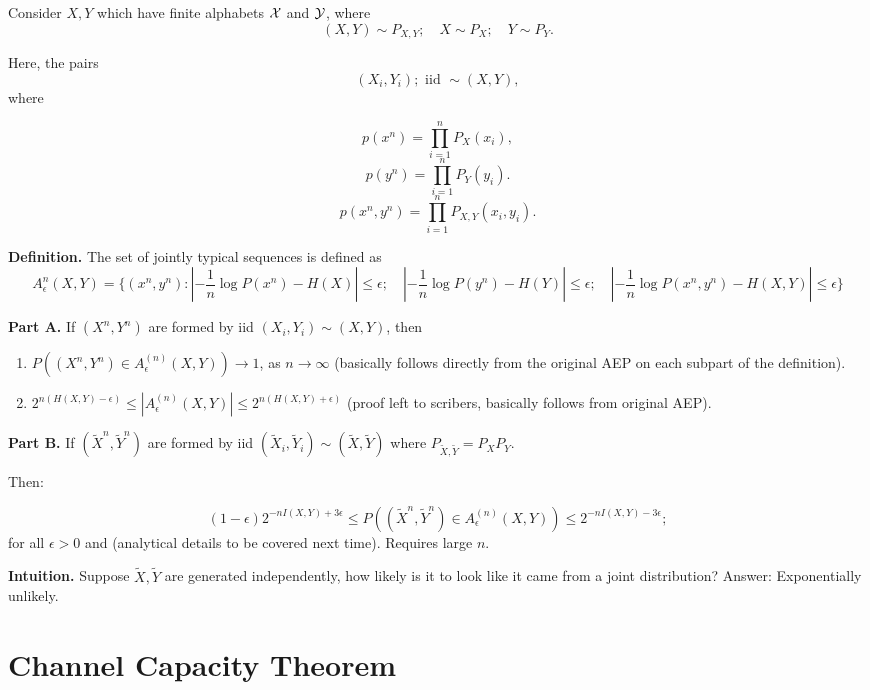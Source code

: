 Consider $X, Y$ which have finite alphabets $\mathcal{X}$ and $\mathcal{Y}$, where
\[
  (X, Y) \sim P_{X, Y}; \quad X \sim P_X; \quad Y \sim P_Y.
\]

Here, the pairs
\[
  (X_i, Y_i); \text{ iid } \sim (X, Y),
\]
where 

\[
  p(x^n) = \prod_{i=1}^{n} P_X(x_i),
\]
\[
  p(y^n) = \prod_{i=1}^{n} P_Y (y_i).
\]
\[
  p(x^n, y^n) = \prod_{i=1}^{n} P_{X, Y} (x_i, y_i).
\]

{\bf Definition.} The set of jointly typical sequences is defined as
\[
  A^{n}_{\epsilon} (X, Y) = \{ (x^n, y^n): \left |-\frac{1}{n} \log P(x^n) - H(X) \right | \leq \epsilon; \quad \left | - \frac{1}{n} \log P(y^n) - H(Y) \right | \leq \epsilon; \quad \left |- \frac{1}{n} \log P(x^n, y^n) - H(X, Y) \right | \leq \epsilon\}
\]

{\bf Part A.} If $(X^n, Y^n)$ are formed by iid $(X_i, Y_i) \sim (X, Y)$, then

\def\typ{A_{\epsilon}^{(n)} (X, Y)}
\begin{enumerate}
  \item $ P( (X^n, Y^n) \in A_{\epsilon}^{(n)} (X, Y)) \to 1$, as $n \to \infty$ (basically follows directly from the original AEP on each subpart of the definition).

  \item $ 2^{n(H(X, Y) - \epsilon)} \leq | \typ | \leq 2^{n (H(X, Y) + \epsilon)}$ (proof left to scribers, basically follows from original AEP).
\end{enumerate}

{\bf Part B.} If $(\tilde{X}^n, \tilde{Y}^n)$ are formed  by iid $(\tilde{X}_i, \tilde{Y}_i) \sim (\tilde{X}, \tilde{Y})$ where $P_{\tilde{X}, \tilde{Y}} = P_X P_Y$.

Then:

\def\Xt{\tilde{X}}
\def\Yt{\tilde{Y}}

\[
  (1 - \epsilon) 2^{-n I(X, Y) + 3 \epsilon} \leq P( (\Xt^n, \Yt^n)  \in \typ ) \leq 2^{-n I(X, Y) - 3 \epsilon};
\]
for all $\epsilon > 0$ and (analytical details to be covered next time).  Requires large $n$.

{\bf Intuition.} Suppose $\Xt, \Yt$ are generated independently, how likely is it to look like it came from a joint distribution?  Answer: Exponentially unlikely.


\section{Channel Capacity Theorem}

